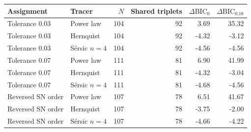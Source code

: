 \begin{tabular}{llrrrr}
\toprule
Assignment & Tracer & $N$ & Shared triplets & $\Delta\mathrm{BIC}_0$ & $\Delta\mathrm{BIC}_{0.18}$ \\
\midrule
Tolerance 0.03 & Power law & 104 & 92 & 3.69 & 35.32 \\
Tolerance 0.03 & Hernquist & 104 & 92 & -4.32 & -3.12 \\
Tolerance 0.03 & S\'ersic $n=4$ & 104 & 92 & -4.56 & -4.56 \\
Tolerance 0.07 & Power law & 111 & 81 & 6.90 & 41.99 \\
Tolerance 0.07 & Hernquist & 111 & 81 & -4.32 & -3.04 \\
Tolerance 0.07 & S\'ersic $n=4$ & 111 & 81 & -4.68 & -4.56 \\
Reversed SN order & Power law & 107 & 78 & 6.51 & 41.67 \\
Reversed SN order & Hernquist & 107 & 78 & -3.75 & -2.00 \\
Reversed SN order & S\'ersic $n=4$ & 107 & 78 & -4.66 & -4.22 \\
\bottomrule
\end{tabular}
